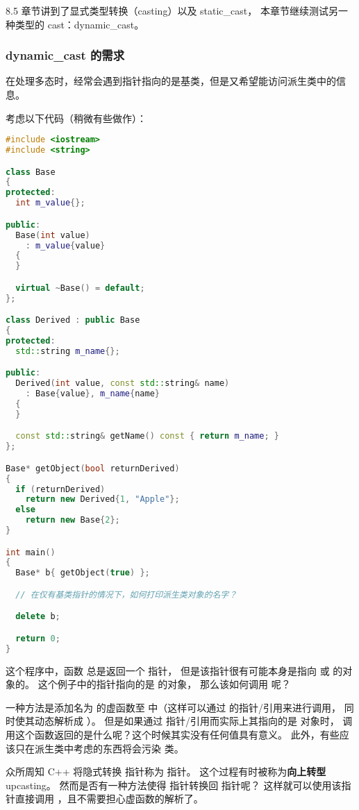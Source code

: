 \documentclass[../../LearnCpp.tex]{subfiles}
\begin{document}

8.5 章节讲到了显式类型转换（casting）以及 static\_cast，
本章节继续测试另一种类型的 cast：dynamic\_cast。

\subsubsection*{dynamic\_cast 的需求}

在处理多态时，经常会遇到指针指向的是基类，但是又希望能访问派生类中的信息。

考虑以下代码（稍微有些做作）：

\begin{lstlisting}[language=C++]
#include <iostream>
#include <string>

class Base
{
protected:
  int m_value{};

public:
  Base(int value)
    : m_value{value}
  {
  }

  virtual ~Base() = default;
};

class Derived : public Base
{
protected:
  std::string m_name{};

public:
  Derived(int value, const std::string& name)
    : Base{value}, m_name{name}
  {
  }

  const std::string& getName() const { return m_name; }
};

Base* getObject(bool returnDerived)
{
  if (returnDerived)
    return new Derived{1, "Apple"};
  else
    return new Base{2};
}

int main()
{
  Base* b{ getObject(true) };

  // 在仅有基类指针的情况下，如何打印派生类对象的名字？

  delete b;

  return 0;
}
\end{lstlisting}

这个程序中，函数  总是返回一个  指针，
但是该指针很有可能本身是指向  或  的对象的。
这个例子中的指针指向的是  的对象，
那么该如何调用  呢？

一种方法是添加名为  的虚函数至  中（这样可以通过  的指针/引用来进行调用，
同时使其动态解析成 ）。
但是如果通过  指针/引用而实际上其指向的是  对象时，
调用这个函数返回的是什么呢？这个时候其实没有任何值具有意义。
此外，有些应该只在派生类中考虑的东西将会污染  类。

众所周知 C++ 将隐式转换  指针称为  指针。
这个过程有时被称为\textbf{向上转型} upcasting。
然而是否有一种方法使得  指针转换回  指针呢？
这样就可以使用该指针直接调用 ，且不需要担心虚函数的解析了。
\end{document}
